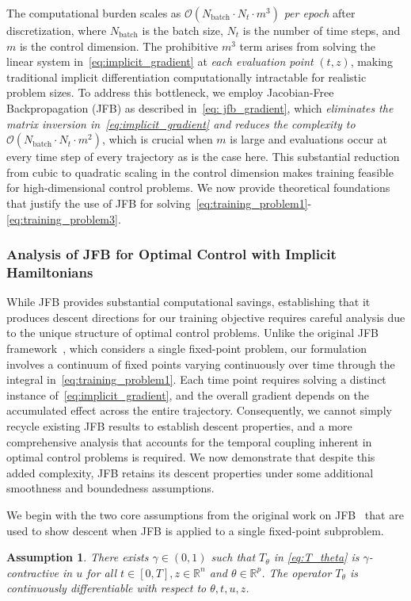 \documentclass[letterpaper, 10 pt, conference]{ieeeconf}  %
\newtheorem{assumption}{Assumption}
\begin{document}
    The computational burden scales as $\mathcal{O}(N_{\text{batch}} \cdot N_t \cdot m^3)$ \emph{per epoch} after discretization, where $N_{\text{batch}}$ is the batch size, $N_t$ is the number of time steps, and $m$ is the control dimension. The prohibitive $m^3$ term arises from solving the linear system in~\eqref{eq:implicit_gradient} at \emph{each evaluation point} $(t,z)$, making traditional implicit differentiation computationally intractable for realistic problem sizes. 
    To address this bottleneck, we employ Jacobian-Free Backpropagation (JFB) as described in~\eqref{eq: jfb_gradient}, which \emph{eliminates the matrix inversion in~\eqref{eq:implicit_gradient} and reduces the complexity to $\mathcal{O}(N_{\text{batch}} \cdot N_t \cdot m^2)$}, which is crucial when $m$ is large and evaluations occur at every time step of every trajectory as is the case here. 
    This substantial reduction from cubic to quadratic scaling in the control dimension makes training feasible for high-dimensional control problems. 
    We now provide theoretical foundations that justify the use of JFB for solving~\eqref{eq:training_problem1}-\eqref{eq:training_problem3}.

    \subsubsection{Analysis of JFB for Optimal Control with Implicit Hamiltonians}
    \label{subsec: JFB_analysis}

    While JFB provides substantial computational savings, establishing that it produces descent directions for our training objective requires careful analysis due to the unique structure of optimal control problems. Unlike the original JFB framework~\cite{fung2022jfb}, which considers a single fixed-point problem, our formulation involves a continuum of fixed points varying continuously over time through the integral in~\eqref{eq:training_problem1}. Each time point requires solving a distinct instance of~\eqref{eq:implicit_gradient}, and the overall gradient depends on the accumulated effect across the entire trajectory. Consequently, we cannot simply recycle existing JFB results to establish descent properties, and a more comprehensive analysis that accounts for the temporal coupling inherent in optimal control problems is required. We now demonstrate that despite this added complexity, JFB retains its descent properties under some additional smoothness and boundedness assumptions.

    We begin with the two core assumptions from the original work on JFB~\cite{fung2022jfb} that are used to show descent when JFB is applied to a single fixed-point subproblem.
    \begin{assumption}
    There exists $\gamma \in  (0,1)$ such that $T_\theta$ in \eqref{eq:T_theta} is $\gamma$-contractive in $u$ for all $t \in [0,T], z \in \mathbb{R}^n$ and $ \theta \in \mathbb{R}^p$. The operator $T_{\theta}$ is continuously differentiable with respect to $\theta, t, u, z$.
    \label{assumption_1}
    \end{assumption}
\end{document}
